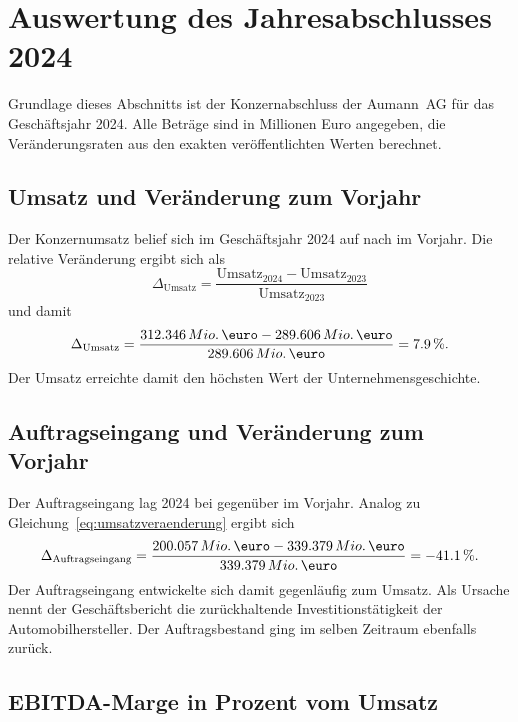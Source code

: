 \section{Auswertung des Jahresabschlusses 2024}
\label{sec:jahresabschluss}

Grundlage dieses Abschnitts ist der Konzernabschluss der Aumann~AG f\"ur das
Gesch\"aftsjahr 2024. Alle Betr\"age sind in Millionen Euro angegeben, die
Ver\"anderungsraten aus den exakten ver\"offentlichten Werten berechnet.

\subsection{Umsatz und Ver\"anderung zum Vorjahr}
\label{subsec:umsatz}

Der Konzernumsatz belief sich im Gesch\"aftsjahr 2024 auf
\MioEUR{\UmsatzZFIV} nach \MioEUR{\UmsatzZFIII} im
Vorjahr. Die relative Ver\"anderung ergibt sich als
\begin{equation}
\label{eq:umsatzveraenderung}
\Delta_{\text{Umsatz}}
= \frac{\text{Umsatz}_{2024} - \text{Umsatz}_{2023}}{\text{Umsatz}_{2023}}
\end{equation}
und damit
\[
\Delta_{\text{Umsatz}}
= \frac{\MioEURexakt{\UmsatzZFIV} - \MioEURexakt{\UmsatzZFIII}}
       {\MioEURexakt{\UmsatzZFIII}}
= \Pct{\UmsatzDeltaZFIV}.
\]
Der Umsatz erreichte damit den h\"ochsten Wert der
Unternehmensgeschichte.

\subsection{Auftragseingang und Ver\"anderung zum Vorjahr}
\label{subsec:auftragseingang}

Der Auftragseingang lag 2024 bei \MioEUR{\AuftragseingangZFIV} gegen\"uber
\MioEUR{\AuftragseingangZFIII} im Vorjahr. Analog zu
Gleichung~\eqref{eq:umsatzveraenderung} ergibt sich
\[
\Delta_{\text{Auftragseingang}}
= \frac{\MioEURexakt{\AuftragseingangZFIV} - \MioEURexakt{\AuftragseingangZFIII}}
       {\MioEURexakt{\AuftragseingangZFIII}}
= \Pct{\AuftragseingangDeltaZFIV}.
\]
Der Auftragseingang entwickelte sich damit gegenl\"aufig zum Umsatz. Als
Ursache nennt der Gesch\"aftsbericht die zur\"uckhaltende Investitionst\"atigkeit
der Automobilhersteller. Der Auftragsbestand ging im selben
Zeitraum ebenfalls zur\"uck.

\subsection{EBITDA-Marge in Prozent vom Umsatz}
\label{subsec:ebitda-marge}

